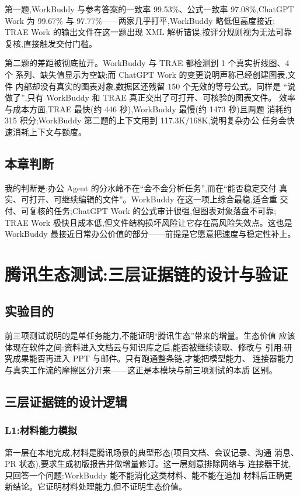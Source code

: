 \documentclass[
  12pt,
  a4paper,
  oneside,
  headings=normal,
  numbers=noendperiod,
  listof=totoc,
  bibliography=totoc
]{scrreprt}
\begin{document}
第一题,WorkBuddy 与参考答案的一致率 99.53\%、公式一致率 97.08\%,ChatGPT
Work 为 99.67\% 与 97.77\%——两家几乎打平,WorkBuddy 略低但高度接近;
TRAE Work 的输出文件在这一题出现 XML 解析错误,按评分规则视为无法可靠
复核,直接触发交付门槛。

第二题的差距被彻底拉开。WorkBuddy 与 TRAE 都检测到 1 个真实折线图、4 个
系列、缺失值显示为空缺;而 ChatGPT Work 的变更说明声称已经创建图表,文件
内部却没有真实的图表对象,数据区还残留 150 个无效的等号公式。同样是
“说做了”,只有 WorkBuddy 和 TRAE 真正交出了可打开、可核验的图表文件。
效率与成本方面,TRAE 最快(约 446 秒),WorkBuddy 最慢(约 1473 秒)且两题
消耗约 315 积分;WorkBuddy 第二题的上下文用到 117.3K/168K,说明复杂办公
任务会快速消耗上下文与额度。

\section{本章判断}

我的判断是:办公 Agent 的分水岭不在“会不会分析任务”,而在“能否稳定交付
真实、可打开、可继续编辑的文件”。WorkBuddy 在这一项上综合最稳,适合重
交付、可复核的任务;ChatGPT Work 的公式审计很强,但图表对象落盘不可靠;
TRAE Work 极快且成本低,但文件结构损坏风险让它存在高风险失效点。这也是
WorkBuddy 最接近日常办公价值的部分——前提是它愿意把速度与稳定性补上。
\chapter{腾讯生态测试:三层证据链的设计与验证}

\section{实验目的}

前三项测试说明的是单任务能力,不能证明“腾讯生态”带来的增量。生态价值
应该体现在软件之间:资料进入文档云与知识库之后,能否被继续读取、修改与
引用;研究成果能否再进入 PPT 与邮件。只有跑通整条链,才能把模型能力、
连接器能力与真实工作流的摩擦区分开来——这正是本模块与前三项测试的本质
区别。

\section{三层证据链的设计逻辑}

\subsection{L1:材料能力模拟}

第一层在本地完成,材料是腾讯场景的典型形态(项目文档、会议记录、沟通
消息、PR 状态),要求生成初版报告并做增量修订。这一层刻意排除网络与
连接器干扰,只回答一个问题:WorkBuddy 能不能消化这类材料、能不能在追加
材料后正确更新结论。它证明材料处理能力,但不证明生态价值。
\end{document}
